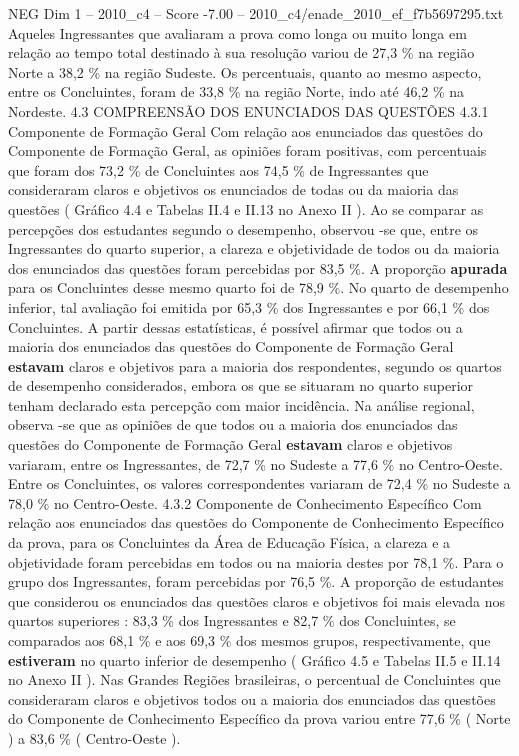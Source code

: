\begin{textsample}{NEG Dim 1 – 2010\_c4 – Score -7.00 – 2010\_c4/enade\_2010\_ef\_f7b5697295.txt}
Aqueles Ingressantes que avaliaram a prova como longa ou muito longa em relação ao tempo total destinado à sua resolução variou de 27,3 \% na região Norte a 38,2 \% na região Sudeste.
Os percentuais, quanto ao mesmo aspecto, entre os Concluintes, foram de 33,8 \% na região Norte, indo até 46,2 \% na Nordeste. 4.3 COMPREENSÃO DOS ENUNCIADOS DAS QUESTÕES 4.3.1 Componente de Formação Geral Com relação aos enunciados das questões do Componente de Formação Geral, as opiniões foram positivas, com percentuais que foram dos 73,2 \% de Concluintes aos 74,5 \% de Ingressantes que consideraram claros e objetivos os enunciados de todas ou da maioria das questões ( Gráfico 4.4 e Tabelas II.4 e II.13 no Anexo II ).
Ao se comparar as percepções dos estudantes segundo o desempenho, observou -se que, entre os Ingressantes do quarto superior, a clareza e objetividade de todos ou da maioria dos enunciados das questões foram percebidas por 83,5 \%.
A proporção \textbf{apurada} para os Concluintes desse mesmo quarto foi de 78,9 \%.
No quarto de desempenho inferior, tal avaliação foi emitida por 65,3 \% dos Ingressantes e por 66,1 \% dos Concluintes.
A partir dessas estatísticas, é possível afirmar que todos ou a maioria dos enunciados das questões do Componente de Formação Geral \textbf{estavam} claros e objetivos para a maioria dos respondentes, segundo os quartos de desempenho considerados, embora os que se situaram no quarto superior tenham declarado esta percepção com maior incidência.
Na análise regional, observa -se que as opiniões de que todos ou a maioria dos enunciados das questões do Componente de Formação Geral \textbf{estavam} claros e objetivos variaram, entre os Ingressantes, de 72,7 \% no Sudeste a 77,6 \% no Centro-Oeste.
Entre os Concluintes, os valores correspondentes variaram de 72,4 \% no Sudeste a 78,0 \% no Centro-Oeste. 4.3.2 Componente de Conhecimento Específico Com relação aos enunciados das questões do Componente de Conhecimento Específico da prova, para os Concluintes da Área de Educação Física, a clareza e a objetividade foram percebidas em todos ou na maioria destes por 78,1 \%.
Para o grupo dos Ingressantes, foram percebidas por 76,5 \%.
A proporção de estudantes que considerou os enunciados das questões claros e objetivos foi mais elevada nos quartos superiores : 83,3 \% dos Ingressantes e 82,7 \% dos Concluintes, se comparados aos 68,1 \% e aos 69,3 \% dos mesmos grupos, respectivamente, que \textbf{estiveram} no quarto inferior de desempenho ( Gráfico 4.5 e Tabelas II.5 e II.14 no Anexo II ).
Nas Grandes Regiões brasileiras, o percentual de Concluintes que consideraram claros e objetivos todos ou a maioria dos enunciados das questões do Componente de Conhecimento Específico da prova variou entre 77,6 \% ( Norte ) a 83,6 \% ( Centro-Oeste ).

\end{textsample}
